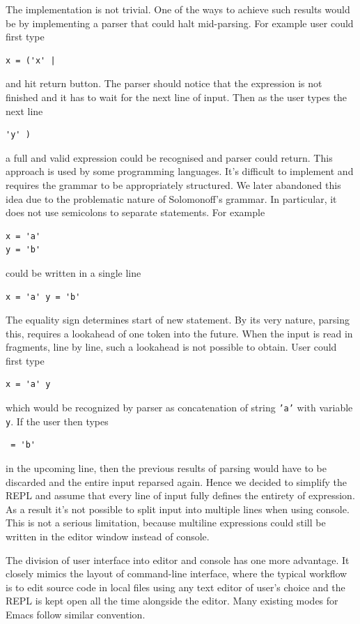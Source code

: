 The implementation is not trivial. One of the ways to achieve such results would be by implementing a parser that could halt mid-parsing. For example user could first type
\begin{lstlisting}
x = ('x' |
\end{lstlisting}
and hit return button. The parser should notice that the expression is not finished and it has to wait for the next line of input.  Then as the user types the next line
\begin{lstlisting}
'y' )
\end{lstlisting}
a full and valid expression could be recognised and parser could return.
This approach is used by some programming languages. It's difficult to implement and requires the grammar to be appropriately structured. We later abandoned this idea due to the problematic nature of Solomonoff's grammar. In particular, it does not use semicolons to separate statements. For example
\begin{lstlisting}
x = 'a' 
y = 'b'
\end{lstlisting}
could be written in a single line
\begin{lstlisting}
x = 'a' y = 'b'
\end{lstlisting}
The equality sign determines start of new statement. By its very nature, parsing this, requires a lookahead of one token into the future. When the input is read in fragments, line by line, such a lookahead is not possible to obtain.
User could first type
\begin{lstlisting}
x = 'a' y
\end{lstlisting}
which would be recognized by parser as concatenation of string \texttt{'a'} with variable \texttt{y}. If the user then types
\begin{lstlisting}
 = 'b'
\end{lstlisting}
in the upcoming line, then the previous results of parsing would have to be discarded and the entire input reparsed again. Hence we decided to simplify the REPL and assume that every line of input fully defines the entirety of expression. As a result it's not possible to split input into multiple lines when using console. This is not a serious limitation, because multiline expressions could still be written in the editor window instead of console. 

The division of user interface into editor and console has one more advantage. It closely mimics the layout of command-line interface, where the typical workflow is to edit source code in local files using any text editor of user's choice and the REPL is kept open all the time alongside the editor. Many existing modes for Emacs follow similar convention.

